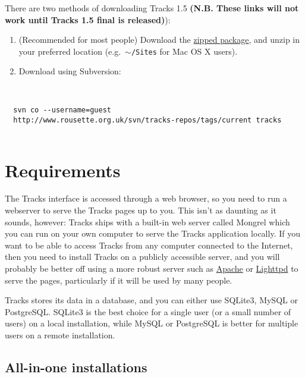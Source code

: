 \documentclass[10pt,twoside]{memoir}
\begin{document}
There are two methods of downloading Tracks 1.5 \textbf{(N.B. These links will not work until Tracks 1.5 final is released)}):


\begin{enumerate}


\item (Recommended for most people) Download the \href{http://www.rousette.org.uk/projects/files/tracks-current.zip}{zipped package}, and unzip in your preferred location (e.g.\ \texttt{\ensuremath{\sim}/Sites} for Mac OS X users).

\item Download using Subversion:
\end{enumerate}

\begin{adjustwidth}{2.5em}{2.5em}
\begin{verbatim}


  svn co --username=guest
  http://www.rousette.org.uk/svn/tracks-repos/tags/current tracks


\end{verbatim}
\end{adjustwidth}

\section{Requirements}
\label{requirements}

The Tracks interface is accessed through a web browser, so you need to run a webserver to serve the Tracks pages up to you. This isn't as daunting as it sounds, however: Tracks ships with a built-in web server called Mongrel which you can run on your own computer to serve the Tracks application locally. If you want to be able to access Tracks from any computer connected to the Internet, then you need to install Tracks on a publicly accessible server, and you will probably be better off using a more robust server such as \href{http://www.apache.org/}{Apache} or \href{http://www.lighttpd.net/}{Lighttpd} to serve the pages, particularly if it will be used by many people.


Tracks stores its data in a database, and you can either use SQLite3, MySQL or PostgreSQL. SQLite3 is the best choice for a single user (or a small number of users) on a local installation, while MySQL or PostgreSQL is better for multiple users on a remote installation.


\subsection{All-in-one installations}
\label{all-in-oneinstallations}
\end{document}
